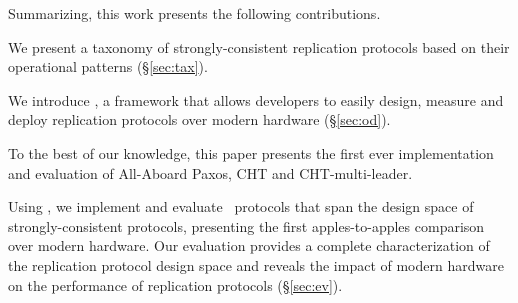  Summarizing, this work presents the following contributions.
\squishlistContrib
\item We present a taxonomy of strongly-consistent replication protocols based on their operational patterns (\S\ref{sec:tax}).
\item We introduce \odlib, a framework that allows developers to  
easily design, measure and deploy replication protocols over modern hardware (\S\ref{sec:od}).
\item To the best of our knowledge, this paper presents the first ever implementation and evaluation of All-Aboard Paxos, CHT and CHT-multi-leader. 
\item Using \odlib, we implement and evaluate \pnum~protocols that  
span the design space of strongly-consistent protocols, presenting the first  
apples-to-apples comparison over modern hardware.
Our evaluation provides a complete characterization of the replication protocol design space and reveals the impact of modern hardware on the performance of replication protocols (\S\ref{sec:ev}).



\squishend

{





















}